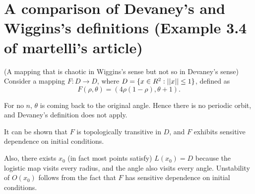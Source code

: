 \documentclass[11pt]{book}
\begin{document}
\section{A comparison of Devaney's and Wiggins's definitions (Example 3.4 of martelli's article)}
\begin{proposition}
  (A mapping that is chaotic in Wiggins's sense but not so in Devaney's sense)
  Consider a mapping $F: D \to D$, where $D = \{x \in R^2: \left|\left|x\right|\right| \leq 1\}$, defined as
  \begin{equation*}
    F(\rho, \theta) = (4\rho(1 - \rho), \theta + 1).
  \end{equation*}
\end{proposition}
For no $n$, $\theta$ is coming back to the original angle. 
Hence there is no periodic orbit, and Devaney's definition does not apply.

It can be shown that $F$ is topologically transitive in $D$, and $F$ exhibits sensitive dependence on initial conditions.

Also, there exists $x_0$ (in fact most points satisfy) $L(x_0) = D$
because the logistic map visits every radius, and the angle also visits every angle.
Unstability of $O(x_0)$ follows from the fact that $F$ has sensitive dependence on initial conditions.
 
\end{document}
